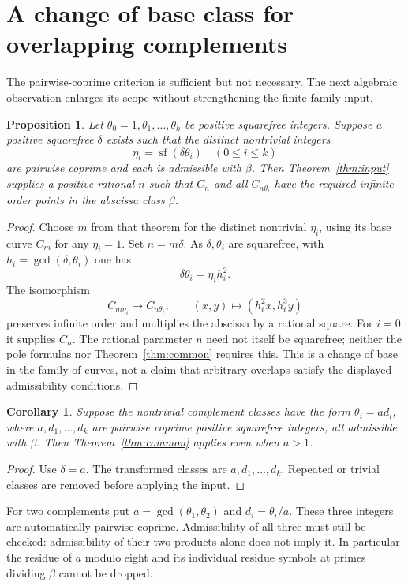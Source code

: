 \documentclass[11pt,a4paper]{article}
\newtheorem{proposition}[theorem]{Proposition}\newtheorem{corollary}[theorem]{Corollary}
\theoremstyle{definition}\newtheorem{definition}[theorem]{Definition}
\theoremstyle{remark}\newtheorem{remark}[theorem]{Remark}
\DeclareMathOperator{\sfree}{sf}
\begin{document}
\section{A change of base class for overlapping complements}
The pairwise-coprime criterion is sufficient but not necessary. The next
algebraic observation enlarges its scope without strengthening the
finite-family input.

\begin{proposition}\label{prop:change}
Let $\theta_0=1,\theta_1,\ldots,\theta_k$ be positive squarefree
integers. Suppose a positive squarefree $\delta$ exists such that the
distinct nontrivial integers
\[
                  \eta_i=\sfree(\delta\theta_i)\quad(0\le i\le k)
\]
are pairwise coprime and each is admissible with $\beta$.
Then Theorem~\ref{thm:input} supplies a positive rational $n$ such that
$C_n$ and all $C_{n\theta_i}$ have the required infinite-order points
in the abscissa class $\beta$.
\end{proposition}
\begin{proof}
Choose $m$ from that theorem for the distinct nontrivial $\eta_i$,
using its base curve $C_m$ for any $\eta_i=1$. Set $n=m\delta$.
As $\delta,\theta_i$ are squarefree, with
$h_i=\gcd(\delta,\theta_i)$ one has
\[
                  \delta\theta_i=\eta_i h_i^2.
\]
The isomorphism
\[
 C_{m\eta_i}\longrightarrow C_{n\theta_i},\qquad
                   (x,y)\longmapsto(h_i^2x,h_i^3y)
\]
preserves infinite order and multiplies the abscissa by a rational square.
For $i=0$ it supplies $C_n$. The rational parameter $n$ need not itself
be squarefree; neither the pole formulas nor Theorem~\ref{thm:common}
requires this. This is a change of base in the family of curves, not
a claim that arbitrary overlaps satisfy the displayed admissibility
conditions.
\end{proof}

\begin{corollary}\label{cor:star}
Suppose the nontrivial complement classes have the form
$\theta_i=a d_i$, where $a,d_1,\ldots,d_k$ are pairwise coprime
positive squarefree integers, all admissible with $\beta$.
Then Theorem~\ref{thm:common} applies even when $a>1$.
\end{corollary}
\begin{proof}
Use $\delta=a$. The transformed classes are $a,d_1,\ldots,d_k$.
Repeated or trivial classes are removed before applying the input.
\end{proof}

For two complements put $a=\gcd(\theta_1,\theta_2)$ and
$d_i=\theta_i/a$. These three integers are automatically pairwise
coprime. Admissibility of all three must still be checked: admissibility
of their two products alone does not imply it. In particular the residue
of $a$ modulo eight and its individual residue symbols at primes dividing
$\beta$ cannot be dropped.
\end{document}
